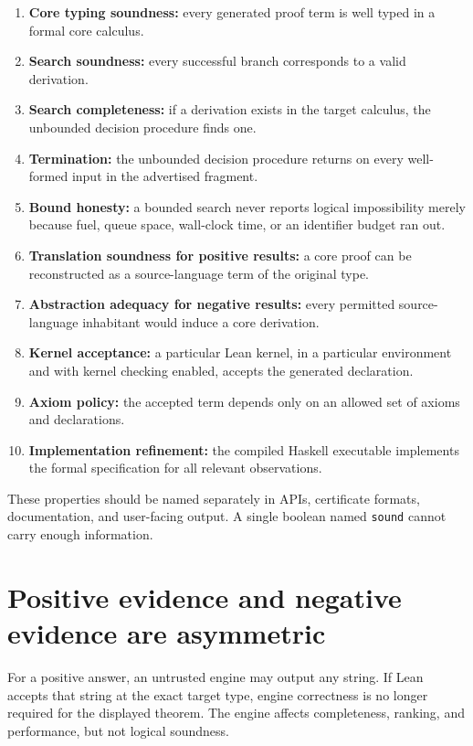 \documentclass[11pt,letterpaper,openany]{report}
\theoremstyle{definition}
\theoremstyle{remark}
\newcommand{\code}[1]{\texttt{#1}}
\begin{document}
\begin{enumerate}
\item \textbf{Core typing soundness:} every generated proof term is well typed in a formal core calculus.
\item \textbf{Search soundness:} every successful branch corresponds to a valid derivation.
\item \textbf{Search completeness:} if a derivation exists in the target calculus, the unbounded decision procedure finds one.
\item \textbf{Termination:} the unbounded decision procedure returns on every well-formed input in the advertised fragment.
\item \textbf{Bound honesty:} a bounded search never reports logical impossibility merely because fuel, queue space, wall-clock time, or an identifier budget ran out.
\item \textbf{Translation soundness for positive results:} a core proof can be reconstructed as a source-language term of the original type.
\item \textbf{Abstraction adequacy for negative results:} every permitted source-language inhabitant would induce a core derivation.
\item \textbf{Kernel acceptance:} a particular Lean kernel, in a particular environment and with kernel checking enabled, accepts the generated declaration.
\item \textbf{Axiom policy:} the accepted term depends only on an allowed set of axioms and declarations.
\item \textbf{Implementation refinement:} the compiled Haskell executable implements the formal specification for all relevant observations.
\end{enumerate}

These properties should be named separately in APIs, certificate formats, documentation, and user-facing output. A single boolean named \code{sound} cannot carry enough information.

\section{Positive evidence and negative evidence are asymmetric}

For a positive answer, an untrusted engine may output any string. If Lean accepts that string at the exact target type, engine correctness is no longer required for the displayed theorem. The engine affects completeness, ranking, and performance, but not logical soundness.
\end{document}
